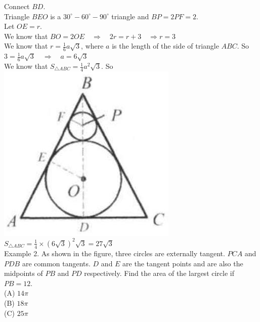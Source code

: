 \documentclass[10pt]{article}
\begin{document}
Connect \(B D\).\\
Triangle \(B E O\) is a \(30^{\circ}-60^{\circ}-90^{\circ}\) triangle and \(B P=2 P F=2\).\\
Let \(O E=r\).\\
We know that \(B O=2 O E \quad \Rightarrow \quad 2 r=r+3 \quad \Rightarrow r=3\)\\
We know that \(r=\frac{1}{6} a \sqrt{3}\), where \(a\) is the length of the side of triangle \(A B C\). So \(3=\frac{1}{6} a \sqrt{3} \quad \Rightarrow \quad a=6 \sqrt{3}\)\\
We know that \(S_{\triangle A B C}=\frac{1}{4} a^{2} \sqrt{3}\). So\\
\includegraphics[max width=\textwidth, center]{2025_04_17_97bc1f7e44d93c271a88g-176(2)}\\
\(S_{\triangle A B C}=\frac{1}{4} \times(6 \sqrt{3})^{2} \sqrt{3}=27 \sqrt{3}\)\\
Example 2. As shown in the figure, three circles are externally tangent. \(P C A\) and \(P D B\) are common tangents. \(D\) and \(E\) are the tangent points and are also the midpoints of \(P B\) and \(P D\) respectively. Find the area of the largest circle if \(P B=12\).\\
(A) \(14 \pi\)\\
(B) \(18 \pi\)\\
(C) \(25 \pi\)\\
\end{document}
